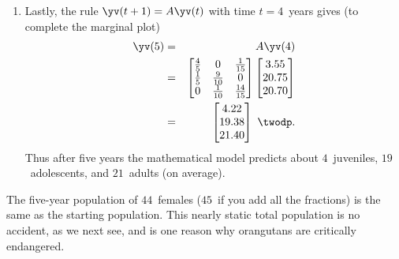 \begin{example}[orangutans]
\begin{solution}
\begin{enumerate}
\item Lastly, the rule \(\yv(t+1)=A\yv(t)\) with time \(t=4\)~years gives (to complete the marginal plot)
%
\begin{eqnarray*}
\yv(5)&=&A\yv(4)
\\&=&\begin{bmatrix} \frac45&0&\frac1{15}
\\\frac15&\frac9{10}&0
\\0&\frac1{10}&\frac{14}{15} \end{bmatrix}
\begin{bmatrix} 3.55\\20.75\\20.70 \end{bmatrix}
\\&=&\begin{bmatrix} 4.22\\19.38\\21.40 \end{bmatrix}\ \twodp.
\end{eqnarray*}
Thus after five years the mathematical model predicts about \(4\)~juveniles, \(19\)~adolescents, and \(21\)~adults (on average).
\end{enumerate}
The five-year population of \(44\)~females (\(45\)~if you add all the fractions) is the same as the starting population.
This nearly static total population is no accident, as we next see, and is one reason why orangutans are critically endangered.
\end{solution}
\end{example}





